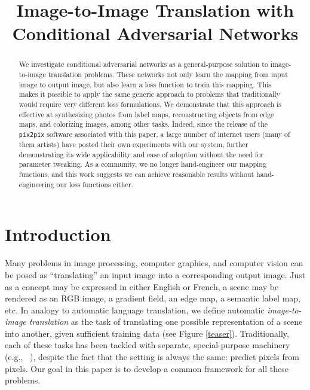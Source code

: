 \title{Image-to-Image Translation with Conditional Adversarial Networks}

\begin{abstract}
We investigate conditional adversarial networks as a general-purpose solution to image-to-image translation problems. These networks not only learn the mapping from input image to output image, but also learn a loss function to train this mapping. This makes it possible to apply the same generic approach to problems that traditionally would require very different loss formulations. We demonstrate that this approach is effective at synthesizing photos from label maps, reconstructing objects from edge maps, and colorizing images, among other tasks. Indeed, since the release of the {\tt pix2pix} software associated with this paper, a large number of internet users (many of them artists) have posted their own experiments with our system, further demonstrating its wide applicability and ease of adoption without the need for parameter tweaking. As a community, we no longer hand-engineer our mapping functions, and this work suggests we can achieve reasonable results without hand-engineering our loss functions either.
\end{abstract}

\section{Introduction}

Many problems in image processing, computer graphics, and computer vision can be posed as ``translating'' an input image into a corresponding output image. Just as a concept may be expressed in either English or French, a scene may be rendered as an RGB image, a gradient field, an edge map, a semantic label map, etc. In analogy to automatic language translation, we define automatic \emph{image-to-image translation} as the task of translating one possible representation of a scene into another, given sufficient training data (see Figure \ref{teaser}).
Traditionally, each of these tasks has been tackled with separate, special-purpose machinery (e.g., ~\cite{efros2001image, hertzmann2001image, fergus2006removing, buades2005non, chen2009sketch2photo, shih2013data, laffont2014transient, long2015fully, eigen2015predicting, xie2015holistically, zhang2016colorful}), despite the fact that the setting is always the same: predict pixels from pixels. Our goal in this paper is to develop a common framework for all these problems.

